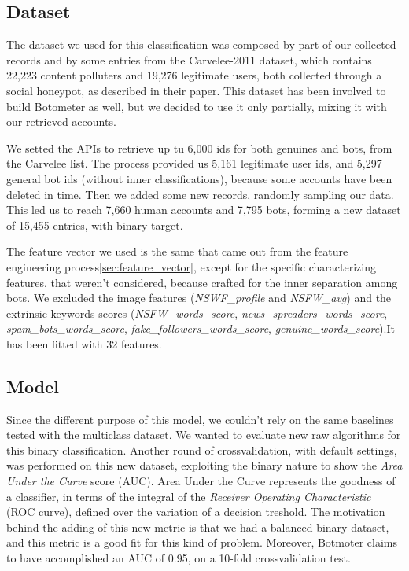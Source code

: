 \subsection{Dataset}
The dataset we used for this classification was composed by part of our collected records and by some entries from the Carvelee-2011 dataset, which contains 22,223 content polluters and 19,276 legitimate users, both collected through a social honeypot, as described in their paper\cite{Lee11sevenmonths}.
This dataset has been involved to build Botometer as well, but we decided to use it only partially, mixing it with our retrieved accounts.

We setted the APIs to retrieve up tu 6,000 ids for both genuines and bots, from the Carvelee list. The process provided us 5,161 legitimate user ids, and 5,297 general bot ids (without inner classifications), because some accounts have been deleted in time.
Then we added some new records, randomly sampling our data. This led us to reach 7,660 human accounts and 7,795 bots, forming a new dataset of 15,455 entries, with binary target.

The feature vector we used is the same that came out from the feature engineering process\ref{sec:feature_vector}, except for the specific characterizing features, that weren't considered, because crafted for the inner separation among bots. We excluded the image features (\textit{NSWF\_profile} and \textit{NSFW\_avg}) and the extrinsic keywords scores (\textit{NSFW\_words\_score}, \textit{news\_spreaders\_words\_score}, \textit{spam\_bots\_words\_score}, \textit{fake\_followers\_words\_score}, \textit{genuine\_words\_score}).It has been fitted with 32 features.

\subsection{Model}
Since the different purpose of this model, we couldn't rely on the same baselines tested with the multiclass dataset. We wanted to evaluate new raw algorithms for this binary classification.
Another round of crossvalidation, with default settings, was performed on this new dataset, exploiting the binary nature to show the \textit{Area Under the Curve} score (AUC).
Area Under the Curve represents the goodness of a classifier, in terms of the integral of the \textit{Receiver Operating Characteristic} (ROC curve), defined over the variation of a decision treshold.
The motivation behind the adding of this new metric is that we had a balanced binary dataset, and this metric is a good fit for this kind of problem. Moreover, Botmoter claims to have accomplished an AUC of 0.95, on a 10-fold crossvalidation test.

